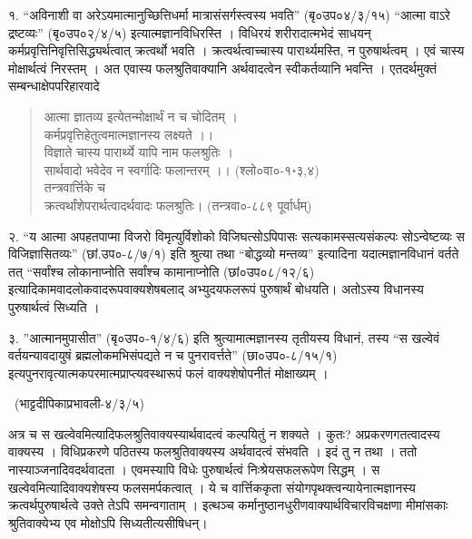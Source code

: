 १. “अविनाशी वा अरेऽयमात्मानुच्छित्तिधर्मा मात्रासंसर्गस्त्वस्य भवति” (बृ०उप०४/३/१५) “आत्मा वाऽरे द्रष्टव्यः” (बृ०उप०२/४/५) इत्यात्मज्ञानविधिरस्ति । विधिरयं शरीरादात्मभेदं साधयन् कर्मप्रवृत्तिनिवृत्तिसिद्ध्यर्थत्वात् क्रत्वर्थो भवति । क्रत्वर्थत्वाच्चास्य पारार्थ्यमस्ति, न पुरुषार्थत्वम् । एवं चास्य मोक्षार्थत्वं निरस्तम् । अत एवास्य फलश्रुतिवाक्यानि अर्थवादत्वेन स्वीकर्तव्यानि भवन्ति । एतदर्थमुक्तं सम्बन्धाक्षेपपरिहारवादे 
\begin{verse}
आत्मा ज्ञातव्य इत्येतन्मोक्षार्थं न च चोदितम् ।\\
कर्मप्रवृत्तिहेतुत्वमात्मज्ञानस्य लक्ष्यते ।।\\
विज्ञाते चास्य पारार्थ्ये यापि नाम फलश्रुतिः ।\\
सार्थवादो भवेदेव न स्वर्गादिः फलान्तरम् ।। (श्लो०वा०-१॰३,४)\\
तन्त्रवार्त्तिके च\\
क्रत्वर्थांशेपरार्थत्वादर्थवादः फलश्रुतिः। (तन्त्रवा०-८८९ पूर्वार्धम्)
\end{verse}

२. “य आत्मा अपहतपाप्मा विजरो विमृत्युर्विशोको विजिघत्सोऽपिपासः सत्यकामस्सत्यसंकल्पः सोऽन्वेष्टव्यः स विजिज्ञासितव्यः” (छां.उप०-८/७/१) इति श्रुत्या तथा “बोद्धव्यो मन्तव्य” इत्यादिना यदात्मज्ञानविधानं वर्तते तत् “सर्वांश्च लोकानाप्नोति सर्वांश्च कामानाप्नोति (छां०उप०८/१२/६) इत्यादिकामवादलोकवादरूपवाक्यशेषबलाद् अभ्युदयफलरूपं पुरुषार्थं बोधयति। अतोऽस्य विधानस्य पुरुषार्थत्वं सिध्यति ।

३. ”आत्मानमुपासीत” (बृ०उप०-१/४/६) इति श्रुत्यामात्मज्ञानस्य तृतीयस्य विधानं, तस्य “स खल्वेवं वर्तयन्यावदायुषं ब्रह्मलोकमभिसंपद्यते न च पुनरावर्त्तते” (छा०उप०-८/१५/१) इत्यपुनरावृत्यात्मकपरमात्मप्राप्त्यवस्थारूपं फलं वाक्यशेषोपनीतं मोक्षाख्यम् । 

~\hfill (भाट्टदीपिकाप्रभावली-४/३/५) 

अत्र च स खल्वेवमित्यादिफलश्रुतिवाक्यस्यार्थवादत्वं कल्पयितुं न शक्यते । कुतः? अप्रकरणगतत्वादस्य वाक्यस्य । विधिप्रकरणे पठितस्य फलश्रुतिवाक्यस्य अर्थवादत्वं संभवति । इदं तु न तथा । ततो नास्याञ्जनादिवदर्थवादता । एवमस्यापि विधेः पुरुषार्थत्वं निःश्रेयसफलरूपेण सिद्धम् । स खल्वेवमित्यादिवाक्यशेषस्य फलसमर्पकत्वात् । ये च वार्त्तिककृता संयोगपृथक्त्वन्यायेनात्मज्ञानस्य क्रत्वर्थपुरुषार्थत्वे उक्ते तेऽपि समन्वगाताम् । इत्थञ्च कर्मानुष्ठानधुरीणवाक्यार्थविचारविचक्षणा मीमांसकाः श्रुतिवाक्येभ्य एव मोक्षोऽपि सिध्यतीत्यसीषिधन्।

